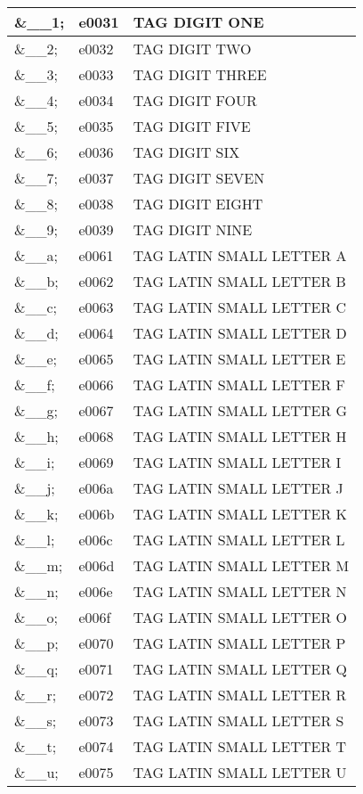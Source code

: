 \documentclass[12pt,letterpaper,openany]{book}
\begin{document}
\begin{center}
\begin{supertabular}{|m{0.25in}|m{0.5in}|m{4in}|}
\&\_\_1; & e0031 & TAG DIGIT ONE\\\hline
\&\_\_2; & e0032 & TAG DIGIT TWO\\\hline
\&\_\_3; & e0033 & TAG DIGIT THREE\\\hline
\&\_\_4; & e0034 & TAG DIGIT FOUR\\\hline
\&\_\_5; & e0035 & TAG DIGIT FIVE\\\hline
\&\_\_6; & e0036 & TAG DIGIT SIX\\\hline
\&\_\_7;  & e0037 & TAG DIGIT SEVEN\\\hline
\&\_\_8;  & e0038 & TAG DIGIT EIGHT\\\hline
\&\_\_9; & e0039 & TAG DIGIT NINE\\\hline
\&\_\_a; & e0061 & TAG LATIN SMALL LETTER A\\\hline
\&\_\_b; & e0062 & TAG LATIN SMALL LETTER B\\\hline
\&\_\_c; & e0063 & TAG LATIN SMALL LETTER C\\\hline
\&\_\_d; & e0064 & TAG LATIN SMALL LETTER D\\\hline
\&\_\_e; & e0065 & TAG LATIN SMALL LETTER E\\\hline
\&\_\_f; & e0066 & TAG LATIN SMALL LETTER F\\\hline
\&\_\_g; & e0067 & TAG LATIN SMALL LETTER G\\\hline
\&\_\_h; & e0068 & TAG LATIN SMALL LETTER H\\\hline
\&\_\_i; & e0069 & TAG LATIN SMALL LETTER I\\\hline
\&\_\_j; & e006a & TAG LATIN SMALL LETTER J\\\hline
\&\_\_k; & e006b & TAG LATIN SMALL LETTER K\\\hline
\&\_\_l; & e006c & TAG LATIN SMALL LETTER L\\\hline
\&\_\_m; & e006d & TAG LATIN SMALL LETTER M\\\hline
\&\_\_n; & e006e & TAG LATIN SMALL LETTER N\\\hline
\&\_\_o; & e006f & TAG LATIN SMALL LETTER O\\\hline
\&\_\_p; & e0070 & TAG LATIN SMALL LETTER P\\\hline
\&\_\_q; & e0071 & TAG LATIN SMALL LETTER Q\\\hline
\&\_\_r; & e0072 & TAG LATIN SMALL LETTER R\\\hline
\&\_\_s; & e0073 & TAG LATIN SMALL LETTER S\\\hline
\&\_\_t; & e0074 & TAG LATIN SMALL LETTER T\\\hline
\&\_\_u; & e0075 & TAG LATIN SMALL LETTER U\\\hline

\end{supertabular}
\end{center}
\end{document}
